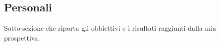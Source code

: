 \subsection{Personali}

Sotto-sezione che riporta gli obbiettivi e i risultati raggiunti dalla mia prospettiva.